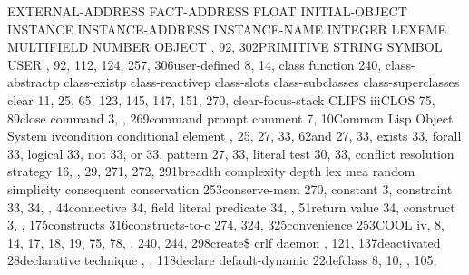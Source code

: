 \documentclass[letterpaper,10pt,english]{sphinxmanual}
\begin{document}
EXTERNAL-ADDRESS FACT-ADDRESS FLOAT
INITIAL-OBJECT INSTANCE INSTANCE-ADDRESS
INSTANCE-NAME INTEGER LEXEME MULTIFIELD
NUMBER OBJECT , 92, 302PRIMITIVE STRING
SYMBOL USER , 92, 112, 124, 257, 306user-defined
8, 14, class function 240, class-abstractp
class-existp class-reactivep class-slots
class-subclasses class-superclasses clear 11,
25, 65, 123, 145, 147, 151, 270, clear-focus-stack
CLIPS iiiCLOS 75, 89close command 3, ,
269command prompt comment 7, 10Common Lisp Object System
ivcondition conditional element , 25, 27, 33, 62and 27,
33, exists 33, forall 33, logical 33,
not 33, or 33, pattern 27, 33, literal
test 30, 33, conflict resolution strategy 16, ,
29, 271, 272, 291breadth complexity depth lex
mea random simplicity consequent
conservation 253conserve-mem 270, constant 3,
constraint 33, 34, , 44connective 34, field
literal predicate 34, , 51return value 34,
construct 3, , 175constructs 316constructs-to-c 274, 324,
325convenience 253COOL iv, 8, 14, 17, 18, 19, 75, 78, , 240, 244,
298create\$ crlf daemon , 121, 137deactivated
28declarative technique , , 118declare
default-dynamic 22defclass 8, 10, , 105,
\end{document}
